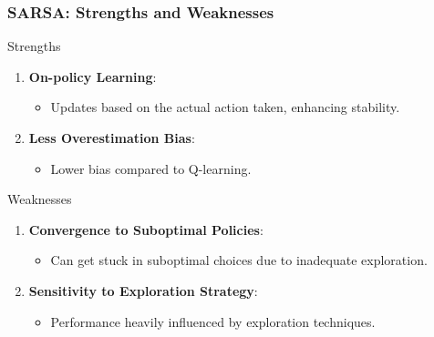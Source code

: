 \documentclass[aspectratio=169]{beamer}
\begin{document}
\begin{frame}[fragile]
    \frametitle{SARSA: Strengths and Weaknesses}
    \begin{block}{Strengths}
        \begin{enumerate}
            \item \textbf{On-policy Learning}:
            \begin{itemize}
                \item Updates based on the actual action taken, enhancing stability.
            \end{itemize}
            \item \textbf{Less Overestimation Bias}:
            \begin{itemize}
                \item Lower bias compared to Q-learning.
            \end{itemize}
        \end{enumerate}
    \end{block}

    \begin{block}{Weaknesses}
        \begin{enumerate}
            \item \textbf{Convergence to Suboptimal Policies}:
            \begin{itemize}
                \item Can get stuck in suboptimal choices due to inadequate exploration.
            \end{itemize}
            \item \textbf{Sensitivity to Exploration Strategy}:
            \begin{itemize}
                \item Performance heavily influenced by exploration techniques.
            \end{itemize}
        \end{enumerate}
    \end{block}
\end{frame}
\end{document}
